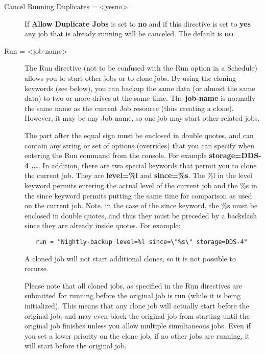 \begin{description}
\item[Cancel Running Duplicates = {\textless}yes{\textbar}no{\textgreater}]
If {\bf Allow Duplicate Jobs} is set to {\bf no} and
if this directive is set to {\bf yes} any job that is already running
will be canceled.  The default is {\bf no}.


\item [Run = {\textless}job-name{\textgreater}]
The Run directive (not to be confused with the Run option in a
Schedule) allows you to start other jobs or to clone jobs. By using the
cloning keywords (see below), you can backup
the same data (or almost the same data) to two or more drives
at the same time. The {\bf job-name} is normally the same name
as the current Job resource (thus creating a clone). However, it
may be any Job name, so one job may start other related jobs.

The part after the equal sign must be enclosed in double quotes,
and can contain any string or set of options (overrides) that you
can specify when entering the Run command from the console. For
example {\bf storage=DDS-4 ...}.  In addition, there are two special
keywords that permit you to clone the current job. They are {\bf level=\%l}
and {\bf since=\%s}. The \%l in the level keyword permits
entering the actual level of the current job and the \%s in the since
keyword permits putting the same time for comparison as used on the
current job.  Note, in the case of the since keyword, the \%s must be
enclosed in double quotes, and thus they must be preceded by a backslash
since they are already inside quotes. For example:

\begin{verbatim}
   run = "Nightly-backup level=%l since=\"%s\" storage=DDS-4"
\end{verbatim}

A cloned job will not start additional clones, so it is not
possible to recurse.

Please note that all cloned jobs, as specified in the Run directives are
submitted for running before the original job is run (while it is being
initialized). This means that any clone job will actually start before
the original job, and may even block the original job from starting
until the original job finishes unless you allow multiple simultaneous
jobs.  Even if you set a lower priority on the clone job, if no other
jobs are running, it will start before the original job.


\end{description}
